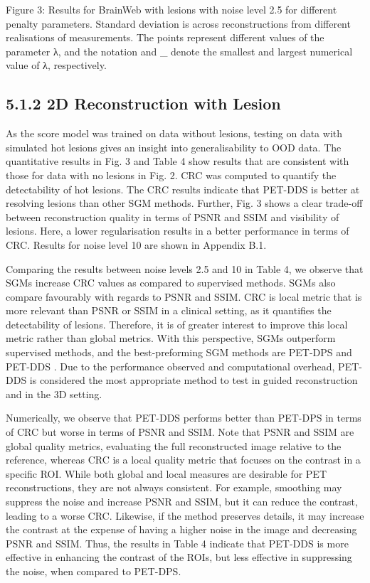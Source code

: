 \documentclass{article}
\begin{document}
Figure 3: Results for BrainWeb with lesions with noise level 2.5 for different penalty parameters. Standard deviation is across reconstructions from different realisations of measurements. The points represent different values of the parameter λ, and the notation and \_ denote the smallest and largest numerical value of λ, respectively.

\subsection{5.1.2 2D Reconstruction with Lesion}

As the score model was trained on data without lesions, testing on data with simulated hot lesions gives an insight into generalisability to OOD data. The quantitative results in Fig. 3 and Table 4 show results that are consistent with those for data with no lesions in Fig. 2. CRC was computed to quantify the detectability of hot lesions. The CRC results indicate that PET-DDS is better at resolving lesions than other SGM methods. Further, Fig. 3 shows a clear trade-off between reconstruction quality in terms of PSNR and SSIM and visibility of lesions. Here, a lower regularisation results in a better performance in terms of CRC. Results for noise level 10 are shown in Appendix B.1.

Comparing the results between noise levels 2.5 and 10 in Table 4, we observe that SGMs increase CRC values as compared to supervised methods. SGMs also compare favourably with regards to PSNR and SSIM. CRC is local metric that is more relevant than PSNR or SSIM in a clinical setting, as it quantifies the detectability of lesions. Therefore, it is of greater interest to improve this local metric rather than global metrics. With this perspective, SGMs outperform supervised methods, and the best-preforming SGM methods are PET-DPS and PET-DDS . Due to the performance observed and computational overhead, PET-DDS is considered the most appropriate method to test in guided reconstruction and in the 3D setting.

Numerically, we observe that PET-DDS performs better than PET-DPS in terms of CRC but worse in terms of PSNR and SSIM. Note that PSNR and SSIM are global quality metrics, evaluating the full reconstructed image relative to the reference, whereas CRC is a local quality metric that focuses on the contrast in a specific ROI. While both global and local measures are desirable for PET reconstructions, they are not always consistent. For example, smoothing may suppress the noise and increase PSNR and SSIM, but it can reduce the contrast, leading to a worse CRC. Likewise, if the method preserves details, it may increase the contrast at the expense of having a higher noise in the image and decreasing PSNR and SSIM. Thus, the results in Table 4 indicate that PET-DDS is more effective in enhancing the contrast of the ROIs, but less effective in suppressing the noise, when compared to PET-DPS.
\end{document}
